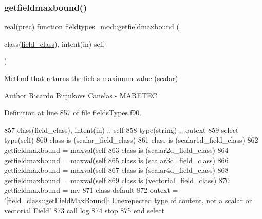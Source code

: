 \subsubsection{\texorpdfstring{getfieldmaxbound()}{getfieldmaxbound()}}
{\footnotesize\ttfamily real(prec) function fieldtypes\+\_\+mod\+::getfieldmaxbound (\begin{DoxyParamCaption}\item[{class(\mbox{\hyperlink{structfieldtypes__mod_1_1field__class}{field\+\_\+class}}), intent(in)}]{self }\end{DoxyParamCaption})\hspace{0.3cm}{\ttfamily [private]}}



Method that returns the field\textquotesingle{}s maximum value (scalar) 

\begin{DoxyAuthor}{Author}
Ricardo Birjukovs Canelas -\/ M\+A\+R\+E\+T\+EC 
\end{DoxyAuthor}


Definition at line 857 of file fields\+Types.\+f90.


\begin{DoxyCode}
857     \textcolor{keywordtype}{class}(field\_class), \textcolor{keywordtype}{intent(in)} :: self
858     \textcolor{keywordtype}{type}(string) :: outext
859     \textcolor{keywordflow}{select type}(self)
860 \textcolor{keywordflow}{    class is} (scalar\_field\_class)
861 \textcolor{keywordflow}{    class is} (scalar1d\_field\_class)
862         getfieldmaxbound = maxval(self%
863 \textcolor{keywordflow}{    class is} (scalar2d\_field\_class)
864         getfieldmaxbound = maxval(self%
865 \textcolor{keywordflow}{    class is} (scalar3d\_field\_class)
866         getfieldmaxbound = maxval(self%
867 \textcolor{keywordflow}{    class is} (scalar4d\_field\_class)
868         getfieldmaxbound = maxval(self%
869 \textcolor{keywordflow}{    class is} (vectorial\_field\_class)
870         getfieldmaxbound = mv
871 \textcolor{keywordflow}{        class default}
872         outext = \textcolor{stringliteral}{'[field\_class::getFieldMaxBound]: Unexepected type of content, not a scalar or vectorial
       Field'}
873         \textcolor{keyword}{call }log%
874         stop
875 \textcolor{keywordflow}{    end select}
\end{DoxyCode}
\mbox{\label{namespacefieldtypes__mod_aec092e7c0b82a7b3a828ae18af80b810}} 
